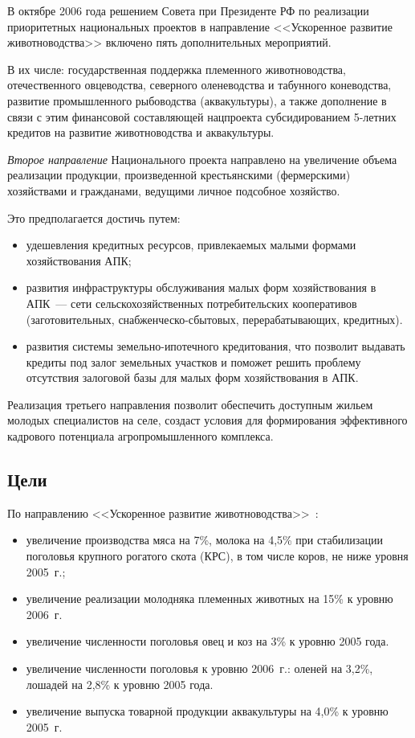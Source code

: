 \documentclass[article, 12pt, russian, oneside]{ncc}
\begin{document}
В октябре 2006 года решением Совета при Президенте РФ по реализации
приоритетных национальных проектов в направление <<Ускоренное развитие
животноводства>> включено пять дополнительных мероприятий.

В их числе: государственная поддержка племенного животноводства,
отечественного овцеводства, северного оленеводства и табунного
коневодства, развитие промышленного рыбоводства (аквакультуры), а
также дополнение в связи с этим финансовой составляющей нацпроекта
субсидированием 5-летних кредитов на развитие животноводства и
аквакультуры.

\emph{Второе направление} Национального проекта направлено на
увеличение объема реализации продукции, произведенной крестьянскими
(фермерскими) хозяйствами и гражданами, ведущими личное подсобное
хозяйство.

Это предполагается достичь путем:

\begin{itemize}
\item удешевления кредитных ресурсов, привлекаемых малыми формами
  хозяйствования АПК;
\item развития инфраструктуры обслуживания малых форм хозяйствования в
  АПК~--- сети сельскохозяйственных потребительских кооперативов
  (заготовительных, снабженческо-сбытовых, перерабатывающих,
  кредит\-ных).
\item развития системы земельно-ипотечного кредитования, что позволит
  выдавать кредиты под залог земельных участков и поможет решить
  проблему отсутствия залоговой базы для малых форм хозяйствования в
  АПК.
\end{itemize}

Реализация третьего направления позволит обеспечить доступным жильем
молодых специалистов на селе, создаст условия для формирования
эффективного кадрового потенциала агропромышленного комплекса.

\subsection{Цели}

По направлению <<Ускоренное развитие
животноводства>>~\cite{APK_Goals}:

\begin{itemize}
\item увеличение производства мяса на 7\%, молока на 4,5\% при
  стабилизации поголовья крупного рогатого скота (КРС), в том числе
  коров, не ниже уровня 2005~г.;
\item увеличение реализации молодняка племенных животных на 15\% к
  уровню 2006~г.
\item увеличение численности поголовья овец и коз на 3\% к уровню 2005
  года.
\item увеличение численности поголовья к уровню 2006~г.: оленей на
  3,2\%, лошадей на 2,8\% к уровню 2005 года.
\item увеличение выпуска товарной продукции аквакультуры на 4,0\% к
  уровню 2005~г.
\end{itemize}
\end{document}
